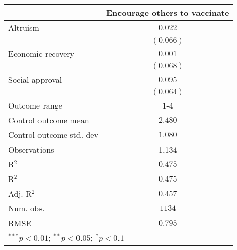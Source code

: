 
\begin{table}
\begin{center}
\begin{tabular}{l c}
\hline
 & Encourage others to vaccinate \\
\hline
Altruism                 & $0.022$   \\
                         & $(0.066)$ \\
Economic recovery        & $0.001$   \\
                         & $(0.068)$ \\
Social approval          & $0.095$   \\
                         & $(0.064)$ \\
\hline
Outcome range            & 1-4       \\
Control outcome mean     & $2.480$   \\
Control outcome std. dev & $1.080$   \\
Observations             & 1,134     \\
R$^{2}$                  & $0.475$   \\
R$^2$                    & $0.475$   \\
Adj. R$^2$               & $0.457$   \\
Num. obs.                & $1134$    \\
RMSE                     & $0.795$   \\
\hline
\multicolumn{2}{l}{\scriptsize{$^{***}p<0.01$; $^{**}p<0.05$; $^{*}p<0.1$}}
\end{tabular}
\caption{}
\label{table:Tables and Figures/SI_table23_motiv_Brazil_encourage1-4}
\end{center}
\end{table}
